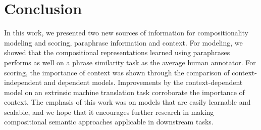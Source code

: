 \documentclass[11pt,letterpaper]{article}
\begin{document}
\section{Conclusion}

In this work, we presented two new sources of information for compositionality modeling and scoring, paraphrase information and context. 
For modeling, we showed that the compositional representations learned using paraphrases performs as well on a phrase similarity task as the average human annotator.
For scoring, the importance of context was shown through the comparison of context-independent and dependent models. 
Improvements by the context-dependent model on an extrinsic machine translation task corroborate the importance of context. 
The emphasis of this work was on models that are easily learnable and scalable, and we hope that it encourages further research in making compositional semantic approaches applicable in downstream tasks. 



\end{document}

